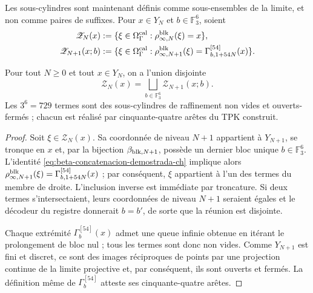 Les sous-cylindres sont maintenant définis comme sous-ensembles de la limite, et non comme paires
de suffixes. Pour \(x\in Y_N\) et \(b\in\mathbb F_3^6\), soient
\begin{align}
 \mathscr Z_N(x)
   &:=\{\xi\in\Omega_\Gamma^{\rm cal}:
       \rho^{\rm blk}_{\infty,N}(\xi)=x\},
 \label{eq:cilindro-real-limite-ch}\\
 \mathscr Z_{N+1}(x;b)
   &:=\{\xi\in\Omega_\Gamma^{\rm cal}:
       \rho^{\rm blk}_{\infty,N+1}(\xi)
       =\Gamma_{b,1+54N}^{[54]}(x)\}.
 \label{eq:subcilindro-real-limite-ch}
\end{align}

\begin{theorem}
\label{thm:particion-729-subcilindros-ch}
Pour tout \(N\ge0\) et tout \(x\in Y_N\), on a l’union disjointe
\begin{equation}
 \mathscr Z_N(x)=
 \bigsqcup_{b\in\mathbb F_3^6}\mathscr Z_{N+1}(x;b).
 \label{eq:particion-real-729-ch}
\end{equation}
Les \(3^6=729\) termes sont des sous-cylindres de raffinement non vides et
ouverts-fermés ; chacun est réalisé par cinquante-quatre arêtes du TPK
construit.
\end{theorem}

\begin{proof}
Soit \(\xi\in\mathscr Z_N(x)\). Sa coordonnée de niveau \(N+1\) appartient à \(Y_{N+1}\), se tronque en \(x\) et, par la bijection \(\beta_{{\rm blk},N+1}\), possède un dernier bloc unique \(b\in\mathbb F_3^6\). L'identité \eqref{eq:beta-concatenacion-demostrada-ch} implique alors \(\rho^{\rm blk}_{\infty,N+1}(\xi)
=\Gamma_{b,1+54N}^{[54]}(x)\) ; par conséquent, \(\xi\) appartient à l'un des termes du membre de droite. L'inclusion inverse est immédiate par troncature. Si deux termes s'intersectaient, leurs coordonnées de niveau \(N+1\) seraient égales et le décodeur du registre donnerait \(b=b'\), de sorte que la réunion est disjointe.

Chaque extrémité \(\Gamma_b^{[54]}(x)\) admet une queue infinie obtenue
en itérant le prolongement de bloc nul ; tous les termes sont donc non
vides. Comme \(Y_{N+1}\) est fini et discret, ce sont des images réciproques de points par
une projection continue de la limite projective et, par conséquent, ils sont ouverts et fermés. La
définition même de \(\Gamma_b^{[54]}\) atteste ses cinquante-quatre arêtes.
\end{proof}


